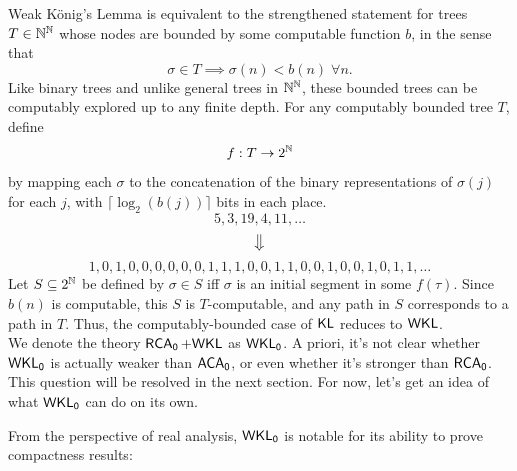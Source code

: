 \documentclass{amsart}
\begin{document}
	Weak K\"onig's Lemma is equivalent to the strengthened statement for trees $T\in \mathbb{N}^{\mathbb{N}}$ whose nodes are bounded by some computable function $b$, in the sense that
	$$
	\sigma \in T \implies \sigma(n) < b(n) \; \forall n.
	$$
	Like binary trees and unlike general trees in $\mathbb{N}^{\mathbb{N}}$, these bounded trees can be computably explored up to any finite depth. For any computably bounded tree $T$, define
	$$f:T\to 2^{\mathbb{N}}$$
	by mapping each $\sigma$ to the concatenation of the binary representations of $\sigma(j)$ for each $j$, with $\lceil \log_2(b(j))\rceil$ bits in each place.
	$$\boxed{5},\boxed{3},\boxed{19},\boxed{4},\boxed{11},\dots$$    
	$$\big\Downarrow$$
	$$\boxed{1,0,1},\boxed{0,0,0,0,0,0,1,1},\boxed{1,0,0,1,1},\boxed{0,0,1,0,0},\boxed{1,0,1,1},\dots$$
	Let $S\subseteq 2^{\mathbb{N}}$ be defined by $\sigma \in S$ iff $\sigma$ is an initial segment in some $f(\tau)$. Since $b(n)$ is computable, this $S$ is $T$-computable, and any path in $S$ corresponds to a path in $T$. Thus, the computably-bounded case of $\operatorname{\sf{KL}}$ reduces to $\sf{WKL}$.\\
	
	We denote the theory $\operatorname{\sf{RCA_0}} + \sf{WKL}$ as $\sf{WKL_0}$. A priori, it's not clear whether $\sf{WKL_0}$ is actually weaker than $\operatorname{\sf{ACA_0}}$, or even whether it's stronger than $\operatorname{\sf{RCA_0}}$. This question will be resolved in the next section. For now, let's get an idea of what $\sf{WKL_0}$ can do on its own.
	
	From the perspective of real analysis, $\sf{WKL_0}$ is notable for its ability to prove compactness results:\\
	
\end{document}
